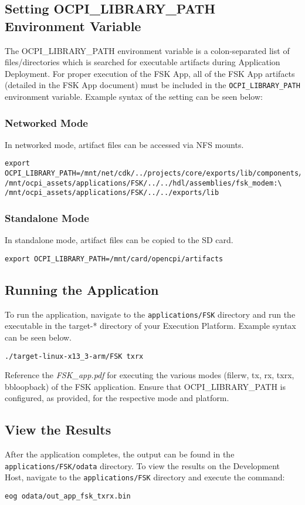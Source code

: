 \begin{flushleft}
\subsection{Setting OCPI\_LIBRARY\_PATH Environment Variable}
The OCPI\_LIBRARY\_PATH environment variable is a colon-separated list of files/directories which is searched for executable artifacts during Application Deployment. For proper execution of the FSK App, all of the FSK App artifacts (detailed in the FSK App document) must be included in the \texttt{OCPI\_LIBRARY\_PATH} environment variable. Example syntax of the setting can be seen below:
\subsubsection{Networked Mode}
In networked mode, artifact files can be accessed via NFS mounts.
\begin{verbatim}
export OCPI_LIBRARY_PATH=/mnt/net/cdk/../projects/core/exports/lib/components/rcc:\
/mnt/ocpi_assets/applications/FSK/../../hdl/assemblies/fsk_modem:\
/mnt/ocpi_assets/applications/FSK/../../exports/lib
\end{verbatim}
\subsubsection{Standalone Mode}
In standalone mode, artifact files can be copied to the SD card.
\begin{verbatim}
export OCPI_LIBRARY_PATH=/mnt/card/opencpi/artifacts
\end{verbatim}
\subsection{Running the Application}
To run the application, navigate to the \texttt{applications/FSK} directory and run the executable in the target-* directory of your Execution Platform. Example syntax can be seen below.
\begin{verbatim}
./target-linux-x13_3-arm/FSK txrx
\end{verbatim}
Reference the \textit{FSK\_app.pdf} for executing the various modes (filerw, tx, rx, txrx, bbloopback) of the FSK application. Ensure that OCPI\_LIBRARY\_PATH is configured, as provided, for the respective mode and platform.
\subsection{View the Results}
After the application completes, the output can be found in the \texttt{applications/FSK/odata} directory. To view the results on the Development Host, navigate to the \texttt{applications/FSK} directory and execute the command:
\begin{verbatim}
eog odata/out_app_fsk_txrx.bin
\end{verbatim}
\end{flushleft}

